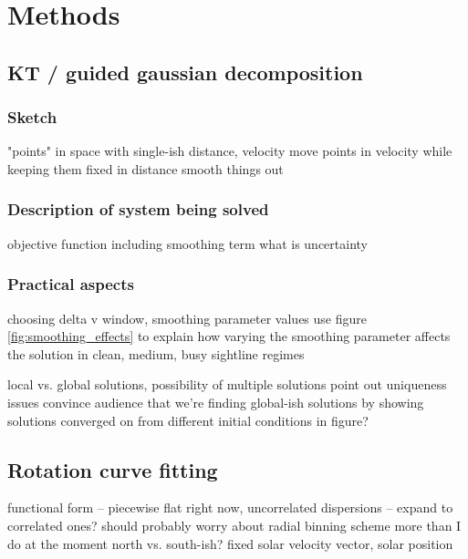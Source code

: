 \section{Methods}

\subsection{KT / guided gaussian decomposition}

\subsubsection{Sketch}
"points" in space with single-ish distance, velocity
move points in velocity while keeping them fixed in distance
smooth things out

\subsubsection{Description of system being solved}
objective function including smoothing term
what is uncertainty

\subsubsection{Practical aspects}
choosing delta v window, smoothing parameter values
use figure \ref{fig:smoothing_effects} to explain how varying the smoothing parameter affects the solution in clean, medium, busy sightline regimes

local vs. global solutions, possibility of multiple solutions
point out uniqueness issues
convince audience that we're finding global-ish solutions by showing solutions converged on from different initial conditions in figure?

\subsection{Rotation curve fitting}
functional form -- piecewise flat 
right now, uncorrelated dispersions -- expand to correlated ones?
should probably worry about radial binning scheme more than I do at the moment
north vs. south-ish?
fixed solar velocity vector, solar position
